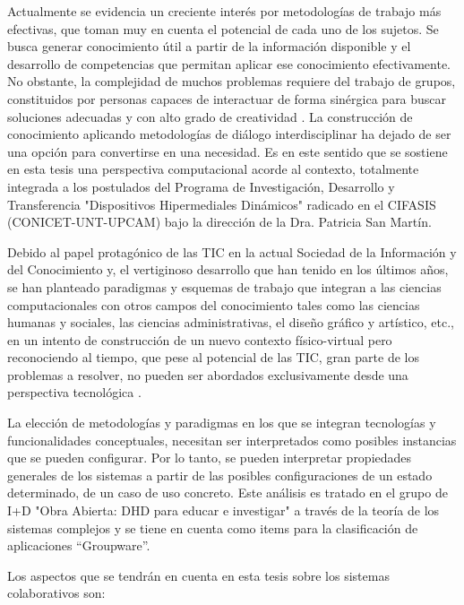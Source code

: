 Actualmente se evidencia un creciente
interés por metodologías de trabajo más
efectivas, que toman muy en cuenta el potencial de cada uno de los sujetos. Se
busca generar conocimiento útil a partir de
la información disponible y el desarrollo de
competencias que permitan aplicar ese
conocimiento efectivamente. No obstante,
la complejidad de muchos problemas
requiere del trabajo de grupos, constituidos por
personas capaces de interactuar de forma
sinérgica para buscar soluciones adecuadas y con alto grado de creatividad \cite{cap1.1}. La construcción de conocimiento aplicando metodologías de diálogo interdisciplinar ha dejado de ser una
opción para convertirse en una necesidad. Es en este sentido que se sostiene en esta tesis una perspectiva computacional acorde al contexto, totalmente integrada a los postulados del Programa de Investigación, Desarrollo y Transferencia "Dispositivos Hipermediales Dinámicos" radicado en el CIFASIS (CONICET-UNT-UPCAM) bajo la dirección de la Dra. Patricia San Martín. 

Debido al papel protagónico de las TIC en la actual Sociedad de la Información y del Conocimiento y, el vertiginoso desarrollo que
han tenido en los últimos años, se han
planteado paradigmas y esquemas de
trabajo que integran a las ciencias
computacionales con otros campos del
conocimiento tales como las ciencias humanas
y sociales, las ciencias administrativas, el
diseño gráfico y artístico, etc., en un
intento de construcción de un nuevo contexto físico-virtual pero
reconociendo al tiempo, que pese al
potencial de las TIC, gran parte de los problemas
a resolver, no pueden ser
abordados exclusivamente desde una
perspectiva tecnológica \cite{cap1.2,cap1.3}. 

La elección de metodologías y paradigmas en los que se integran tecnologías
y funcionalidades conceptuales, necesitan ser interpretados como posibles
instancias que se pueden configurar. Por lo tanto, se pueden interpretar
propiedades generales de los sistemas a partir de las posibles configuraciones
de un estado determinado, de un caso de uso concreto. Este análisis es tratado en el grupo de I+D "Obra Abierta: DHD para educar e investigar"
a través de la teoría de los sistemas complejos y se tiene en cuenta como
items para la clasificación de aplicaciones ``Groupware''.

Los aspectos que se tendrán en cuenta en esta tesis sobre los sistemas colaborativos son:


